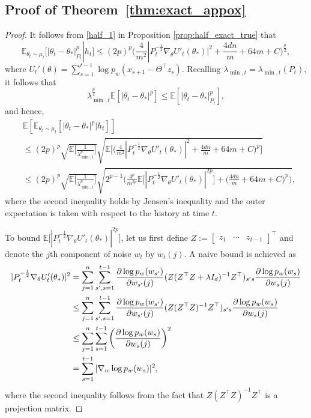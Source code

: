 \documentclass[11pt]{article}
\theoremstyle{plain}
\theoremstyle{definition}
\theoremstyle{remark}
\begin{document}
\subsection{Proof of Theorem~\ref{thm:exact_appox}}
\label{app:thm:exact_appox}
\begin{proof}
It follows from \eqref{half_1} in Proposition \ref{prop:half_exact_true}  that 
\[
\mathbb{E}_{\theta_t \sim \mu_{t}}[|\theta_t-\theta_*|^p_{P_{t}}|h_{t}]\leq (2p)^p\bigg(\frac{4}{m^2}|P_{t}^{-\frac{1}{2}}\nabla_{\theta} U'_{t}(\theta_*)|^2 + \frac{4dn}{m}+ 64m+C\bigg)^{\frac{p}{2}},
\]
where $U_t'(\theta) =\sum_{s=1}^{t-1}\log p_w(x_{s+1}-\Theta^{\top}z_s)$.
Recalling $\lambda_{\min,t}=\lambda_{\min,t}(P_t)$, it follows that
\[
\lambda^{\frac{p}{2}}_{\min,t}\mathbb{E}[|\theta_t -\theta_*|^p]\leq  \mathbb{E}[|\theta_t-\theta_*|^p_{P_{t}}],
\] and hence,
\begin{align}\label{fe}
    &\mathbb{E}[\mathbb{E}_{\theta_t \sim \mu_t}[|\theta_t-\theta_*|^p|h_{t}]] \nonumber \\
    & \leq (2p)^p \sqrt{\mathbb{E}\bigg[\frac{1}{\lambda_{\min,t}^{p}}\bigg]}\sqrt{\mathbb{E}\bigg[\bigg(\frac{4}{m^2}|P_{t}^{-\frac{1}{2}}\nabla_{\theta} U'_{t}(\theta_*)|^2+  \frac{4dn}{m}+ 64m+C\bigg)^p\bigg]}\nonumber\\
    & \leq (2p)^p \sqrt{\mathbb{E}\bigg[\frac{1}{\lambda_{\min,t}^{p}}\bigg]}\sqrt{2^{p-1}\bigg(\frac{4^p}{m^{2p}}\mathbb{E}\bigg[|P_{t}^{-\frac{1}{2}}\nabla_{\theta} U'_{t}(\theta_*)|^{2p}\bigg] + \bigg( \frac{4dn}{m}+ 64m+C\bigg)^p\bigg)},
\end{align}
where the second inequality holds by Jensen's inequality and the outer expectation is taken with respect to the history at time $t$.

To bound $\mathbb{E}\bigg[|P_{t}^{-\frac{1}{2}}\nabla_{\theta} U'_{t}(\theta_*)|^{2p}\bigg]$, let us first define $Z:=\begin{bmatrix} z_1& \cdots &z_{t-1} \end{bmatrix}^\top$ and denote the $j$th component of noise $w_t$ by $w_t(j)$. A naive bound is achieved as
\begin{align}\label{navie:bd}
    |P_{t}^{-\frac{1}{2}}\nabla_{\theta} U'_{t}(\theta_*)|^{2}&= \sum_{j=1}^{n}\sum_{s',s=1}^{t-1}\frac{\partial \log p_w(w_{s'})}{\partial w_{s'}(j)}(Z(Z^{\top}Z + \lambda I_d)^{-1}Z^{\top})_{s's}\frac{\partial \log p_w(w_s)}{\partial w_s(j)}\notag\\
    &\leq \sum_{j=1}^{n}\sum_{s',s=1}^{t-1}\frac{\partial \log p_w(w_{s'})}{\partial w_{s'}(j)}(Z(Z^{\top}Z)^{-1}Z^{\top})_{s's}\frac{\partial \log p_w(w_s)}{\partial w_s(j)}\notag\\
    &\leq \sum_{j=1}^{n}\sum_{s=1}^{t-1}\bigg(\frac{\partial \log p_w(w_s)}{\partial w_s(j)}\bigg)^2 \notag\\
    &= \sum_{s=1}^{t-1}|\nabla_w \log p_w(w_s)|^2,
\end{align}
where the second inequality follows from the fact that $Z(Z^{\top}Z)^{-1}Z^{\top}$ is a projection matrix.


\end{proof}
\end{document}
